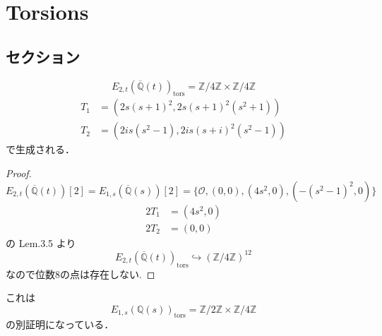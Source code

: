 \documentclass[main]{subfiles}
\begin{document}
\chapter{Torsions}

\section{セクション}

\begin{thm}
    \begin{equation}
        E_{2,t}(\overline{\mathbb{Q}}(t))_ \text{tors} = \mathbb{Z} / 4 \mathbb{Z} \times \mathbb{Z} / 4 \mathbb{Z}
    \end{equation}
    \begin{align}
        T_1 & = (2s(s+1)^2,2s(s+1)^2(s^2+1))   \\
        T_2 & = (2is(s^2-1),2is(s+i)^2(s^2-1))
    \end{align}
    で生成される．
\end{thm}
\begin{proof}
    \begin{equation}
        E_{2,t}(\overline{\mathbb{Q}}(t))[2] = E_{1,s}(\overline{\mathbb{Q}}(s))[2] = \{\mathcal{O}, (0,0), (4s^{2},0),( - (s^{2} - 1)^{2},0)\}
    \end{equation}
    \begin{align}
        2T_1 & = (4s^2,0) \\
        2T_2 & = (0,0)
    \end{align}
    \cite{ref:naskrecki2013} の Lem.3.5 より
    \begin{equation}
        E_{2,t}(\overline{\mathbb{Q}}(t))_ \text{tors} \hookrightarrow (\mathbb{Z} / 4 \mathbb{Z})^{12}
    \end{equation}
    なので位数8の点は存在しない.
\end{proof}

\begin{rem}
    これは
    \begin{equation}
        E_{1,s}(\mathbb{Q}(s))_ \text{tors} = \mathbb{Z} / 2 \mathbb{Z} \times \mathbb{Z} / 4 \mathbb{Z}
    \end{equation}
    の別証明になっている．
\end{rem}
\end{document}
